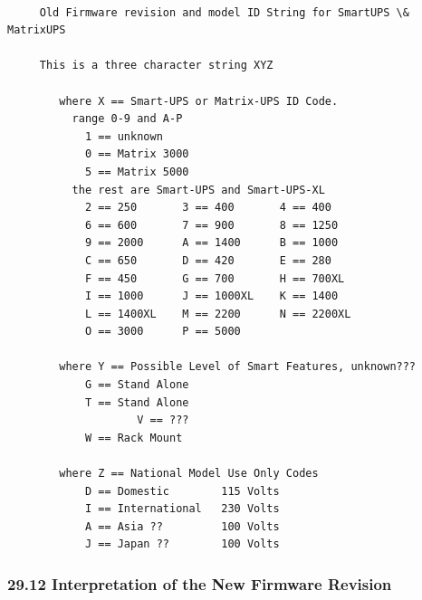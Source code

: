 \footnotesize
\begin{verbatim}
     
     Old Firmware revision and model ID String for SmartUPS \& MatrixUPS
     
     This is a three character string XYZ
     
        where X == Smart-UPS or Matrix-UPS ID Code.
          range 0-9 and A-P
            1 == unknown
            0 == Matrix 3000
            5 == Matrix 5000
          the rest are Smart-UPS and Smart-UPS-XL
            2 == 250       3 == 400       4 == 400
            6 == 600       7 == 900       8 == 1250
            9 == 2000      A == 1400      B == 1000
            C == 650       D == 420       E == 280
            F == 450       G == 700       H == 700XL
            I == 1000      J == 1000XL    K == 1400
            L == 1400XL    M == 2200      N == 2200XL
            O == 3000      P == 5000
     
        where Y == Possible Level of Smart Features, unknown???
            G == Stand Alone
            T == Stand Alone
                    V == ???
            W == Rack Mount
     
        where Z == National Model Use Only Codes
            D == Domestic        115 Volts
            I == International   230 Volts
            A == Asia ??         100 Volts
            J == Japan ??        100 Volts
\end{verbatim}
\normalsize

\label{Interpretation-of-the-New-Firmware-Revision}

\subsubsection*{29.12 Interpretation of the New Firmware Revision}

